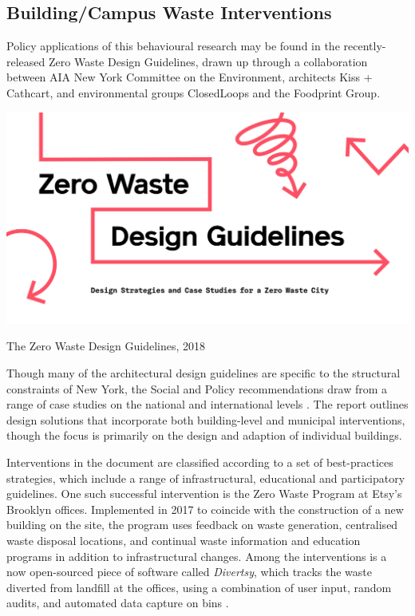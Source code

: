 \documentclass[nofonts,nols,justified,nobib]{tufte-book}
\begin{document}
\subsection*{Building/Campus Waste Interventions}
Policy applications of this behavioural research may be found in the recently-released Zero Waste Design Guidelines, drawn up through a collaboration between AIA New York Committee on the Environment, architects Kiss + Cathcart, and environmental groups ClosedLoops and the Foodprint Group.
\begin{marginfigure}
\includegraphics[width=\textwidth]{img/1/zero-waste-guidelines.png}
\caption{The Zero Waste Design Guidelines, 2018 \cite{aia_new_york_zero_2017}}
\end{marginfigure}
Though many of the architectural design guidelines are specific to the structural constraints of New York, the Social and Policy recommendations draw from a range of case studies on the national and international levels \cite{aia_new_york_zero_2017}. The report outlines design solutions that incorporate both building-level and municipal interventions, though the focus is primarily on the design and adaption of individual buildings.

Interventions in the document are classified according to a set of best-practices strategies, which include a range of infrastructural, educational and participatory guidelines. One such successful intervention is the Zero Waste Program at Etsy's Brooklyn offices. Implemented in 2017 to coincide with the construction of a new building on the site, the program uses feedback on waste generation, centralised waste disposal locations, and continual waste information and education programs in addition to infrastructural changes. Among the interventions is a now open-sourced piece of software called \emph{Divertsy}, which tracks the waste diverted from landfill at the offices, using a combination of user input, random audits, and automated data capture on bins \cite{benninger_divertsy_2019}.
\end{document}
